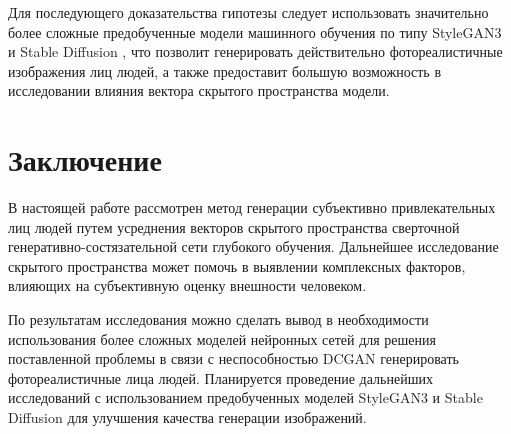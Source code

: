 \documentclass[60x84/16,8pt]{ittmm}
\begin{document}
Для последующего доказательства гипотезы следует использовать
значительно более сложные предобученные модели машинного обучения
по типу StyleGAN3 \cite{stylegan} и Stable Diffusion \cite{sd}, что позволит генерировать
действительно фотореалистичные изображения лиц людей, а также
предоставит большую возможность в исследовании влияния вектора скрытого
пространства модели.

\section{Заключение}

В настоящей работе рассмотрен метод генерации субъективно привлекательных лиц людей
путем усреднения векторов скрытого пространства сверточной
генеративно-состязательной сети глубокого обучения. Дальнейшее исследование скрытого пространства
может помочь в выявлении комплексных факторов, влияющих на субъективную
оценку внешности человеком.

По результатам исследования можно сделать вывод в необходимости
использования более сложных моделей нейронных сетей для решения
поставленной проблемы в связи с неспособностью DCGAN генерировать
фотореалистичные лица людей. Планируется проведение дальнейших исследований
с использованием предобученных моделей StyleGAN3 и Stable Diffusion
для улучшения качества генерации изображений.
\end{document}
